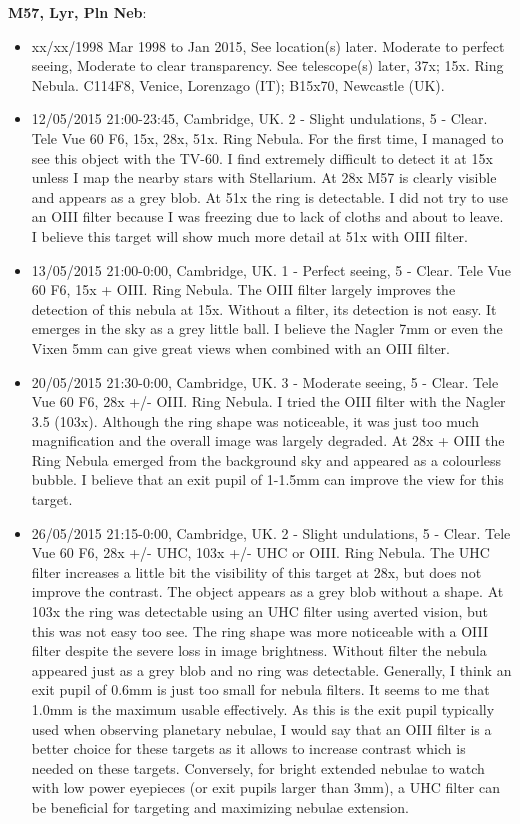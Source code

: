 {\bf M57, Lyr, Pln Neb}:
\begin{itemize}
\item xx/xx/1998 Mar 1998 to Jan 2015, See location(s) later. Moderate to perfect seeing, Moderate to clear transparency. See telescope(s) later, 37x; 15x. Ring Nebula. C114F8, Venice, Lorenzago (IT); B15x70, Newcastle (UK).
\item 12/05/2015 21:00-23:45, Cambridge, UK. 2 - Slight undulations, 5 - Clear. Tele Vue 60 F6, 15x, 28x, 51x. Ring Nebula. For the first time, I managed to see this object with the TV-60. I find extremely difficult to detect it at 15x unless I map the nearby stars with Stellarium. At 28x M57 is clearly visible and appears as a grey blob. At 51x the ring is detectable. I did not try to use an OIII filter because I was freezing due to lack of cloths and about to leave. I believe this target will show much more detail at 51x with OIII filter.
\item 13/05/2015 21:00-0:00, Cambridge, UK. 1 - Perfect seeing, 5 - Clear. Tele Vue 60 F6, 15x + OIII. Ring Nebula. The OIII filter largely improves the detection of this nebula at 15x. Without a filter, its detection is not easy. It emerges in the sky as a grey little ball. I believe the Nagler 7mm or even the Vixen 5mm can give great views when combined with an OIII filter.
\item 20/05/2015 21:30-0:00, Cambridge, UK. 3 - Moderate seeing, 5 - Clear. Tele Vue 60 F6, 28x +/- OIII. Ring Nebula. I tried the OIII filter with the Nagler 3.5 (103x). Although the ring shape was noticeable, it was just too much magnification and the overall image was largely degraded. At 28x + OIII the Ring Nebula emerged from the background sky and appeared as a colourless bubble. I believe that an exit pupil of 1-1.5mm can improve the view for this target.
\item 26/05/2015 21:15-0:00, Cambridge, UK. 2 - Slight undulations, 5 - Clear. Tele Vue 60 F6, 28x +/- UHC, 103x +/- UHC or OIII. Ring Nebula. The UHC filter increases a little bit the visibility of this target at 28x, but does not improve the contrast. The object appears as a grey blob without a shape. At 103x the ring was detectable using an UHC filter using averted vision, but this was not easy too see. The ring shape was more noticeable with a OIII filter despite the severe loss in image brightness. Without filter the nebula appeared just as a grey blob and no ring was detectable. Generally, I think an exit pupil of 0.6mm is just too small for nebula filters. It seems to me that 1.0mm is the maximum usable effectively. As this is the exit pupil typically used when observing planetary nebulae, I would say that an OIII filter is a better choice for these targets as it allows to increase contrast which is needed on these targets. Conversely, for bright extended nebulae to watch with low power eyepieces (or exit pupils larger than 3mm), a UHC filter can be beneficial for targeting and maximizing nebulae extension.

\end{itemize}
